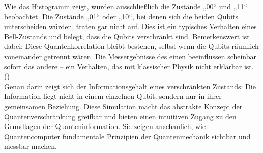 Wie das Histogramm zeigt, wurden ausschließlich die Zustände „00“ und „11“ beobachtet. Die Zustände „01“ oder „10“, bei denen sich die beiden Qubits unterscheiden würden, traten gar nicht auf. Dies ist ein typisches Verhalten eines Bell-Zustands und belegt, dass die Qubits verschränkt sind. Bemerkenswert ist dabei: Diese Quantenkorrelation bleibt bestehen, selbst wenn die Qubits räumlich voneinander getrennt wären. Die Messergebnisse des einen beeinflussen scheinbar sofort das andere – ein Verhalten, das mit klassischer Physik nicht erklärbar ist. (\cite{Bell State ZZ-Measurement}) 
\\


Genau darin zeigt sich der Informationsgehalt eines verschränkten Zustands: Die Information liegt nicht in einem einzelnen Qubit, sondern nur in ihrer gemeinsamen Beziehung. Diese Simulation macht das abstrakte Konzept der Quantenverschränkung greifbar und bieten einen intuitiven Zugang zu den Grundlagen der Quanteninformation. Sie zeigen anschaulich, wie Quantencomputer fundamentale Prinzipien der Quantenmechanik sichtbar und messbar machen. 
\printbibliography
